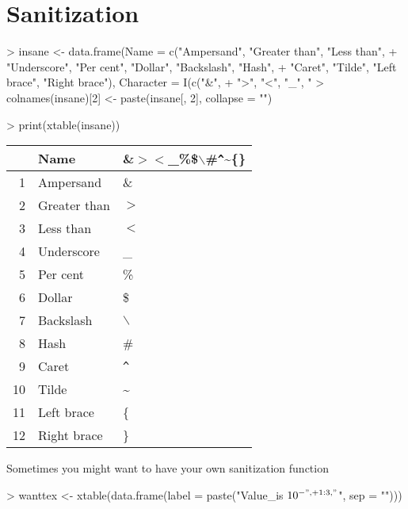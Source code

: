 \documentclass[letterpaper]{article}
\begin{document}
\section{Sanitization}
\begin{Schunk}
\begin{Sinput}
> insane <- data.frame(Name = c("Ampersand", "Greater than", "Less than", 
+     "Underscore", "Per cent", "Dollar", "Backslash", "Hash", 
+     "Caret", "Tilde", "Left brace", "Right brace"), Character = I(c("&", 
+     ">", "<", "_", "%", "$", "\\", "#", "^", "~", "{", "}")))
> colnames(insane)[2] <- paste(insane[, 2], collapse = "")
\end{Sinput}
\end{Schunk}

\begin{Schunk}
\begin{Sinput}
> print(xtable(insane))
\end{Sinput}
% latex table generated in R 2.6.0 by xtable 1.5-2 package
% Wed Oct 10 14:26:37 2007
\begin{table}[ht]
\begin{center}
\begin{tabular}{rll}
  \hline
 & Name & \&$>$$<$\_\%\$$\backslash$\#\verb|^|\~{}\{\} \\
  \hline
1 & Ampersand & \& \\
  2 & Greater than & $>$ \\
  3 & Less than & $<$ \\
  4 & Underscore & \_ \\
  5 & Per cent & \% \\
  6 & Dollar & \$ \\
  7 & Backslash & $\backslash$ \\
  8 & Hash & \# \\
  9 & Caret & \verb|^| \\
  10 & Tilde & \~{} \\
  11 & Left brace & \{ \\
  12 & Right brace & \} \\
   \hline
\end{tabular}
\end{center}
\end{table}\end{Schunk}
Sometimes you might want to have your own sanitization function
\begin{Schunk}
\begin{Sinput}
> wanttex <- xtable(data.frame(label = paste("Value_is $10^{-", 
+     1:3, "}$", sep = "")))
\end{Sinput}
\end{Schunk}
\end{document}
